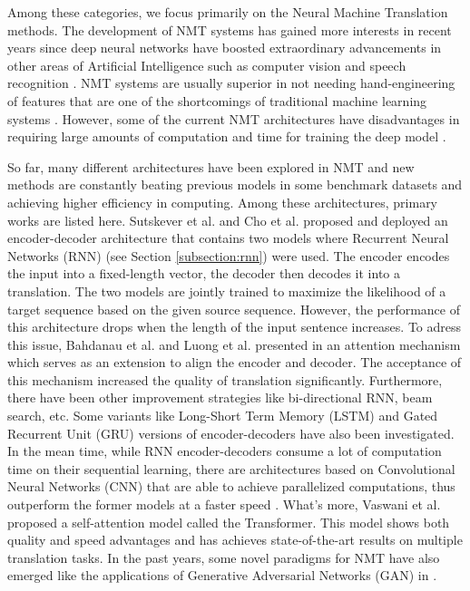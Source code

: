 Among these categories, we focus primarily on the Neural Machine Translation methods. The development of NMT systems has gained more interests in recent years since deep neural networks have boosted extraordinary advancements in other areas of Artificial Intelligence such as computer vision \cite{krizhevsky2012imagenet} and speech recognition \cite{dahl2012context}. NMT systems are usually superior in not needing hand-engineering of features that are one of the shortcomings of traditional machine learning systems \cite{Britz2017}. However, some of the current NMT architectures have disadvantages in requiring large amounts of computation and time for training the deep model \cite{Britz2017}.

So far, many different architectures have been explored in NMT and new methods are constantly beating previous models in some benchmark datasets and achieving higher efficiency in computing. Among these architectures, primary works are listed here. Sutskever et al. \cite{Sutskever2014} and Cho et al. \cite{Cho2014} proposed and deployed an encoder-decoder architecture that contains two models where Recurrent Neural Networks (RNN) (see Section \ref{subsection:rnn}) were used. The encoder encodes the input into a fixed-length vector, the decoder then decodes it into a translation. The two models are jointly trained to maximize the likelihood of a target sequence based on the given source sequence. However, the performance of this architecture drops when the length of the input sentence increases. To adress this issue, Bahdanau et al. and Luong et al. presented in \cite{Bahdanau2014,Luong2015} an attention mechanism which serves as an extension to align the encoder and decoder. The acceptance of this mechanism increased the quality of translation significantly. Furthermore, there have been other improvement strategies like bi-directional RNN, beam search, etc. Some variants like Long-Short Term Memory (LSTM) \cite{hochreiter1997long} and Gated Recurrent Unit (GRU) \cite{Cho2014} versions of encoder-decoders have also been investigated. In the mean time, while RNN encoder-decoders consume a lot of computation time on their sequential learning, there are architectures based on Convolutional Neural Networks (CNN) that are able to achieve parallelized computations, thus outperform the former models at a faster speed \cite{Gehring2017}. What's more, Vaswani et al. \cite{Vaswani2017} proposed a self-attention model called the Transformer. This model shows both quality and speed advantages and has achieves state-of-the-art results on multiple translation tasks. In the past years, some novel paradigms for NMT have also emerged like the applications of Generative Adversarial Networks (GAN) in \cite{wu2017adversarial,yang2017improving}.

